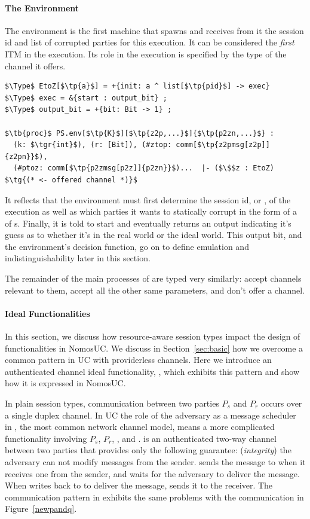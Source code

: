 \paragraph*{\textbf{The Environment}}
The environment is the first machine that  spawns and receives from it the session id and list of corrupted parties for this execution. 
It can be considered the \emph{first} ITM in the execution.
Its role in the execution is specified by the type  of the channel it offers.
\begin{lstlisting}[basicstyle=\scriptsize\BeraMonottFamily, mathescape, frame=single]
$\Type$ EtoZ[$\tp{a}$] = +{init: a ^ list[$\tp{pid}$] -> exec} 
$\Type$ exec = &{start : output_bit} ;
$\Type$ output_bit = +{bit: Bit -> 1} ;

$\tb{proc}$ PS.env[$\tp{K}$][$\tp{z2p,...}$]{$\tp{p2zn,...}$} : 
  (k: $\tgr{int}$), (r: [Bit]), (#ztop: comm[$\tp{z2pmsg[z2p]]{z2pn}}$), 
  (#ptoz: comm[$\tp{p2zmsg[p2z]]{p2zn}}$)...  |- ($\$$z : EtoZ) $\tg{(* <- offered channel *)}$
\end{lstlisting}
It reflects that the environment must first determine the session id, or , of the execution as well as which parties it wants to statically corrupt in the form of a  of s.
Finally, it is told to start and eventually returns an output  indicating it's guess as to whether it's in the real world or the ideal world.
This output bit, and the environment's decision function, go on to define emulation and indistinguishability later in this section. 

The remainder of the main processes of  are typed very similarly: accept channels relevant to them, accept all the other same parameters, and don't offer a channel.

\paragraph*{\textbf{Ideal Functionalities}}
In this section, we discuss how resource-aware session types impact the design of functionalities in NomosUC.
We discuss in Section~\ref{sec:basic} how we overcome a common pattern in UC with providerless channels.
Here we introduce an authenticated channel ideal functionality, \Fauth, which exhibits this pattern and show
how it is expressed in NomosUC.

In plain session types, communication between two parties $P_s$ and $P_r$ occurs over a single duplex channel.
In UC the role of the adversary as a message scheduler in \Fauth, the most common network channel model, means a more complicated functionality involving $P_s$, $P_r$, \F, and \A. 
\Fauth is an authenticated two-way channel between two parties that provides only the following guarantee: (\emph{integrity}) the adversary can not modify messages from the sender.
\Fauth sends the message to \A when it receives one from the sender, and waits for the adversary to deliver the message.
When \A writes back to \Fauth to deliver the message, \Fauth sends it to the receiver.%
The communication pattern in \Fauth exhibits the same problems with the communication in Figure~\ref{newpandq}.


